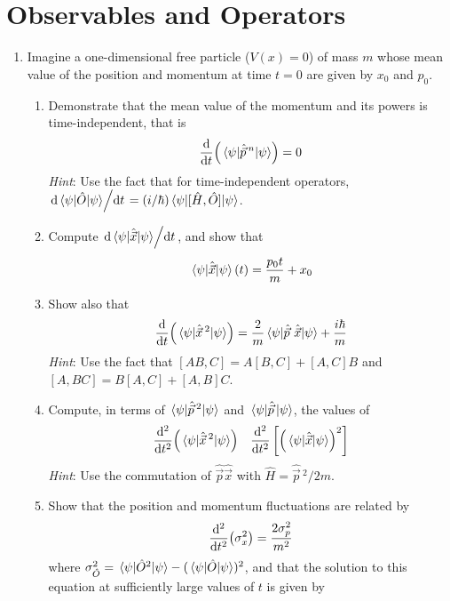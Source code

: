 \documentclass[../psets.tex]{subfiles}
\begin{document}
\section{Observables and Operators}
\begin{enumerate}
    \item {}Imagine a one-dimensional free particle ($V(x)=0$) of mass $m$ whose mean value of the position and momentum at time $t=0$ are given by $x_0$ and $p_0$.
    \begin{enumerate}
        \item Demonstrate that the mean value of the momentum and its powers is time-independent, that is
        \begin{equation}
            \dv{t}(\ev{\hat{\vec{p}}{\,}^n}{\psi}) = 0
        \end{equation}
        \emph{Hint}: Use the fact that for time-independent operators, $\dv*{\ev{\hat{O}}{\psi}}{t}=(i/\hbar)\ev{[\hat{H},\hat{O}]}{\psi}$.
        \item Compute $\dv*{\ev{\hat{\vec{x}}}{\psi}}{t}$, and show that
        \begin{equation}
            \ev{\hat{\vec{x}}}{\psi}(t) = \frac{p_0t}{m}+x_0
        \end{equation}
        \item Show also that
        \begin{equation}
            \dv{t}(\ev{\hat{\vec{x}}{\,}^2}{\psi}) = \frac{2}{m}\ev{\hat{\vec{p}}\ \hat{\vec{x}}}{\psi}+\frac{i\hbar}{m}
        \end{equation}
        \emph{Hint}: Use the fact that $[AB,C]=A[B,C]+[A,C]B$ and $[A,BC]=B[A,C]+[A,B]C$.
        \item Compute, in terms of $\ev{\hat{\vec{p}}{\,}^2}{\psi}$ and $\ev{\hat{\vec{p}}\,}{\psi}$, the values of
        \begin{align}
            \dv[2]{t}(\ev{\hat{\vec{x}}{\,}^2}{\psi})&&
            \dv[2]{t}\left[ \left( \ev{\hat{\vec{x}}}{\psi} \right)^2 \right]
        \end{align}
        \emph{Hint}: Use the commutation of $\hat{\vec{p}}\hat{\vec{x}}$ with $\hat{H}=\hat{\vec{p}}{\,}^2/2m$.
        \item Show that the position and momentum fluctuations are related by
        \begin{equation}
            \dv[2]{t}(\sigma_x^2) = \frac{2\sigma_p^2}{m^2}
        \end{equation}
        where $\sigma_{\hat{O}}^2=\ev{\hat{O}^2}{\psi}-(\ev{\hat{O}}{\psi})^2$, and that the solution to this equation at sufficiently large values of $t$ is given by

\end{enumerate}
\end{enumerate}
\end{document}
